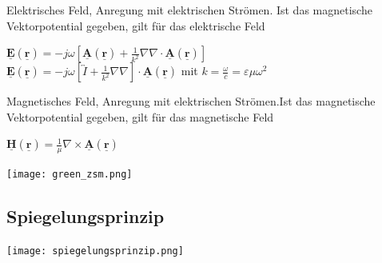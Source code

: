 \documentclass[english]{latex4ei/latex4ei_sheet}
\renewcommand{\vec}[1]{\underline{\boldsymbol{#1}}}
\begin{document}
\begin{sectionbox}
	Elektrisches Feld, Anregung mit elektrischen Strömen. Ist das magnetische Vektorpotential gegeben, gilt für das elektrische Feld\\
	\begin{emphbox}
		$\vec{E}(\vec{r})=-j \omega\left[\vec{A}(\vec{r})+\frac{1}{k^{2}} \nabla \nabla \cdot \vec{A}(\vec{r})\right]$\\
		$\vec{E}(\vec{r})=-j \omega\left[\overleftrightarrow{I}+\frac{1}{k^{2}} \nabla \nabla\right] \cdot \vec{A}(\vec{r})$		
		mit $k=\frac{\omega}{c}=\varepsilon\mu\omega^2$\\
	\end{emphbox}
	Magnetisches Feld, Anregung mit elektrischen Strömen.Ist das magnetische Vektorpotential gegeben, gilt für das magnetische Feld\\
	\begin{emphbox}
		$\vec{H}(\vec{r})=\frac{1}{\mu} \nabla \times \vec{A}(\vec{r})$\\
	\end{emphbox}
	\begin{center}\texttt{[image: green\_zsm.png]}\end{center}

\end{sectionbox}
\begin{sectionbox}
	\subsection{Spiegelungsprinzip}
	\begin{center}\texttt{[image: spiegelungsprinzip.png]}\end{center}
\end{sectionbox}
\end{document}

